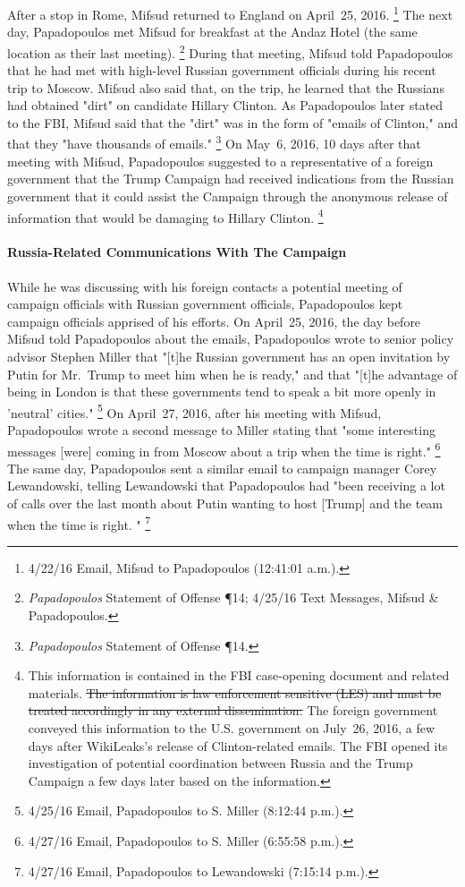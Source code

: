 After a stop in Rome, Mifsud returned to England on April~25, 2016.%
\footnote{4/22/16 Email, Mifsud to Papadopoulos (12:41:01 a.m.).}
The next day, Papadopoulos met Mifsud for breakfast at the Andaz Hotel (the same location as their last meeting).%
\footnote{\textit{Papadopoulos} Statement of Offense \P 14;
4/25/16 Text Messages, Mifsud \& Papadopoulos.}
During that meeting, Mifsud told Papadopoulos that he had met with high-level Russian government officials during his recent trip to Moscow.
Mifsud also said that, on the trip, he learned that the Russians had obtained "dirt" on candidate Hillary Clinton.
As Papadopoulos later stated to the FBI, Mifsud said that the "dirt" was in the form of "emails of Clinton," and that they "have thousands of emails."%
\footnote{\textit{Papadopoulos} Statement of Offense \P 14.}
On May~6, 2016, 10 days after that meeting with Mifsud, Papadopoulos suggested to a representative of a foreign government that the Trump Campaign had received indications from the Russian government that it could assist the Campaign through the anonymous release of information that would be damaging to Hillary Clinton.%
\footnote{This information is contained in the FBI case-opening document and related materials.
\sout{The information is law enforcement sensitive (LES) and must be treated accordingly in any external dissemination.}
The foreign government conveyed this information to the U.S. government on July~26, 2016, a few days after WikiLeaks's release of Clinton-related emails.
The FBI opened its investigation of potential coordination between Russia and the Trump Campaign a few days later based on the information.}

\paragraph{Russia-Related Communications With The Campaign}

While he was discussing with his foreign contacts a potential meeting of campaign officials with Russian government officials, Papadopoulos kept campaign officials apprised of his efforts.
On April~25, 2016, the day before Mifsud told Papadopoulos about the emails, Papadopoulos wrote to senior policy advisor Stephen Miller that "[t]he Russian government has an open invitation by Putin for Mr.~Trump to meet him when he is ready," and that "[t]he advantage of being in London is that these governments tend to speak a bit more openly in 'neutral' cities."%
\footnote{4/25/16 Email, Papadopoulos to S. Miller (8:12:44 p.m.).}
On April~27, 2016, after his meeting with Mifsud, Papadopoulos wrote a second message to Miller stating that "some interesting messages [were] coming in from Moscow about a trip when the time is right."%
\footnote{4/27/16 Email, Papadopoulos to S. Miller (6:55:58 p.m.).}
The same day, Papadopoulos sent a similar email to campaign manager Corey Lewandowski, telling Lewandowski that Papadopoulos had "been receiving a lot of calls over the last month about Putin wanting to host [Trump] and the team when the time is right. "%
\footnote{4/27/16 Email, Papadopoulos to Lewandowski (7:15:14 p.m.).}

